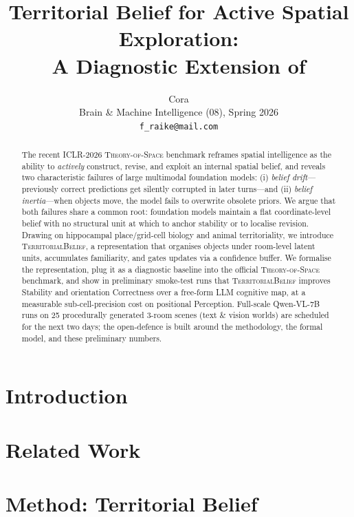 \documentclass{article}
\title{Territorial Belief for Active Spatial Exploration:\\
A Diagnostic Extension of \tos}
\author{%
  Cora \\
  Brain \& Machine Intelligence (08), Spring 2026 \\
  \texttt{f\_raike@mail.com} \\
}
\newcommand{\tos}{\textsc{Theory-of-Space}\xspace}
\newcommand{\tb}{\textsc{TerritorialBelief}\xspace}
\begin{document}
\maketitle

\begin{abstract}
The recent ICLR-2026 \tos benchmark reframes spatial intelligence as the
ability to \emph{actively} construct, revise, and exploit an internal
spatial belief, and reveals two characteristic failures of large
multimodal foundation models: (i) \emph{belief drift}---previously correct
predictions get silently corrupted in later turns---and (ii) \emph{belief
inertia}---when objects move, the model fails to overwrite obsolete
priors. We argue that both failures share a common root: foundation
models maintain a flat coordinate-level belief with no structural unit at
which to anchor stability or to localise revision. Drawing on
hippocampal place/grid-cell biology and animal territoriality, we
introduce \tb, a representation that organises objects under
room-level latent units, accumulates familiarity, and gates updates via
a confidence buffer. We formalise the representation, plug it as a
diagnostic baseline into the official \tos benchmark, and show in
preliminary smoke-test runs that \tb improves Stability and orientation
Correctness over a free-form LLM cognitive map, at a measurable
sub-cell-precision cost on positional Perception. Full-scale Qwen-VL-7B
runs on 25 procedurally generated 3-room scenes (text \& vision worlds)
are scheduled for the next two days; the open-defence is built around
the methodology, the formal model, and these preliminary numbers.
\end{abstract}

\section{Introduction}\label{sec:intro}



\section{Related Work}\label{sec:related}



\section{Method: Territorial Belief}\label{sec:method}
\end{document}
